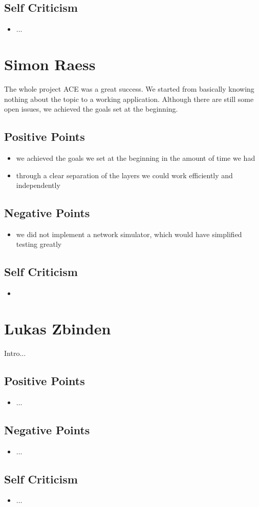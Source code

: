 \subsection{Self Criticism}
\begin{itemize}
\item ...
\end{itemize}



\section{Simon Raess}
The whole project ACE was a great success. We started from basically knowing
nothing about the topic to a working application. Although there are still
some open issues, we achieved the goals set at the beginning.


\subsection{Positive Points}
\begin{itemize}
 \item we achieved the goals we set at the beginning in the amount of time
       we had
 \item through a clear separation of the layers we could work efficiently and independently
\end{itemize}

\subsection{Negative Points}
\begin{itemize}
 \item we did not implement a network simulator, which would have simplified testing greatly
\end{itemize}

\subsection{Self Criticism}
\begin{itemize}
 \item 
\end{itemize}



\section{Lukas Zbinden}
Intro...
\subsection{Positive Points}
\begin{itemize}
\item ...
\end{itemize}

\subsection{Negative Points}
\begin{itemize}
\item ...
\end{itemize}

\subsection{Self Criticism}
\begin{itemize}
\item ...
\end{itemize}

